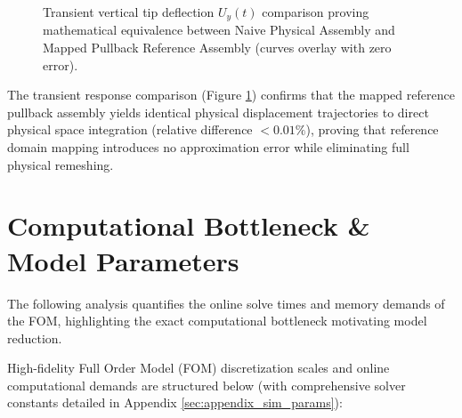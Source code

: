 \begin{figure}[htbp]
    \caption{Transient vertical tip deflection $U_y(t)$ comparison proving mathematical equivalence between Naive Physical Assembly and Mapped Pullback Reference Assembly (curves overlay with zero error).}
    \label{fig:fom_qoi_deflection}
\end{figure}

The transient response comparison (Figure \ref{fig:fom_qoi_deflection}) confirms that the mapped reference pullback assembly yields identical physical displacement trajectories to direct physical space integration (relative difference $< 0.01\%$), proving that reference domain mapping introduces no approximation error while eliminating full physical remeshing.
\newpage
\section{Computational Bottleneck \& Model Parameters}

The following analysis quantifies the online solve times and memory demands of the FOM, highlighting the exact computational bottleneck motivating model reduction.

High-fidelity Full Order Model (FOM) discretization scales and online computational demands are structured below (with comprehensive solver constants detailed in Appendix \ref{sec:appendix_sim_params}):

